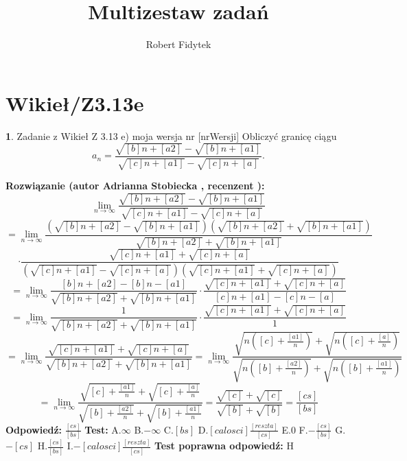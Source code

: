 \documentclass[12pt, a4paper]{article}
\title{Multizestaw zadań}
\author{Robert Fidytek}
\date{}
\theoremstyle{definition} %
\newtheorem{zad}{}
\newcommand{\kategoria}[1]{\section{#1}} %
\newcommand{\zadStart}[1]{\begin{zad}#1\newline} %
\newcommand{\zadStop}{\end{zad}}   %
\newcommand{\rozwStart}[2]{\noindent \textbf{Rozwiązanie (autor #1 , recenzent #2): }\newline} %
\newcommand{\rozwStop}{\newline}                                            %
\newcommand{\odpStart}{\noindent \textbf{Odpowiedź:}\newline}    %
\newcommand{\odpStop}{\newline}                                             %
\newcommand{\testStart}{\noindent \textbf{Test:}\newline} %
\newcommand{\testStop}{\newline} %
\newcommand{\kluczStart}{\noindent \textbf{Test poprawna odpowiedź:}\newline} %
\newcommand{\kluczStop}{\newline} %
\begin{document}
\maketitle


\kategoria{Wikieł/Z3.13e}
\zadStart{Zadanie z Wikieł Z 3.13 e) moja wersja nr [nrWersji]}
Obliczyć granicę ciągu 
$$a_n=\frac{\sqrt{[b]n+[a2]}-\sqrt{[b]n+[a1]}}{\sqrt{[c]n+[a1]}-\sqrt{[c]n+[a]}}.$$
\zadStop
\rozwStart{Adrianna Stobiecka}{}
$$\lim_{n\to\infty}\frac{\sqrt{[b]n+[a2]}-\sqrt{[b]n+[a1]}}{\sqrt{[c]n+[a1]}-\sqrt{[c]n+[a]}}$$
$$=\lim_{n\to\infty}\frac{(\sqrt{[b]n+[a2]}-\sqrt{[b]n+[a1]})(\sqrt{[b]n+[a2]}+\sqrt{[b]n+[a1]})}{\sqrt{[b]n+[a2]}+\sqrt{[b]n+[a1]}}$$
$$\cdot\frac{\sqrt{[c]n+[a1]}+\sqrt{[c]n+[a]}}{(\sqrt{[c]n+[a1]}-\sqrt{[c]n+[a]})(\sqrt{[c]n+[a1]}+\sqrt{[c]n+[a]})}$$
$$=\lim_{n\to\infty}\frac{[b]n+[a2]-[b]n-[a1]}{\sqrt{[b]n+[a2]}+\sqrt{[b]n+[a1]}}\cdot\frac{\sqrt{[c]n+[a1]}+\sqrt{[c]n+[a]}}{[c]n+[a1]-[c]n-[a]}$$
$$=\lim_{n\to\infty}\frac{1}{\sqrt{[b]n+[a2]}+\sqrt{[b]n+[a1]}}\cdot\frac{\sqrt{[c]n+[a1]}+\sqrt{[c]n+[a]}}{1}$$
$$=\lim_{n\to\infty}\frac{\sqrt{[c]n+[a1]}+\sqrt{[c]n+[a]}}{\sqrt{[b]n+[a2]}+\sqrt{[b]n+[a1]}}=\lim_{n\to\infty}\frac{\sqrt{n([c]+\frac{[a1]}{n})}+\sqrt{n([c]+\frac{[a]}{n})}}{\sqrt{n([b]+\frac{[a2]}{n})}+\sqrt{n([b]+\frac{[a1]}{n})}}$$
$$=\lim_{n\to\infty}\frac{\sqrt{[c]+\frac{[a1]}{n}}+\sqrt{[c]+\frac{[a]}{n}}}{\sqrt{[b]+\frac{[a2]}{n}}+\sqrt{[b]+\frac{[a1]}{n}}}=\frac{\sqrt{[c]}+\sqrt{[c]}}{\sqrt{[b]}+\sqrt{[b]}}=\frac{[cs]}{[bs]}$$
\rozwStop
\odpStart
$\frac{[cs]}{[bs]}$
\odpStop
\testStart
A.$\infty$
B.$-\infty$
C.$[bs]$
D.$[calosci]\frac{[reszta]}{[cs]}$
E.$0$
F.$-\frac{[cs]}{[bs]}$
G.$-[cs]$
H.$\frac{[cs]}{[bs]}$
I.$-[calosci]\frac{[reszta]}{[cs]}$
\testStop
\kluczStart
H
\kluczStop
\end{document}
